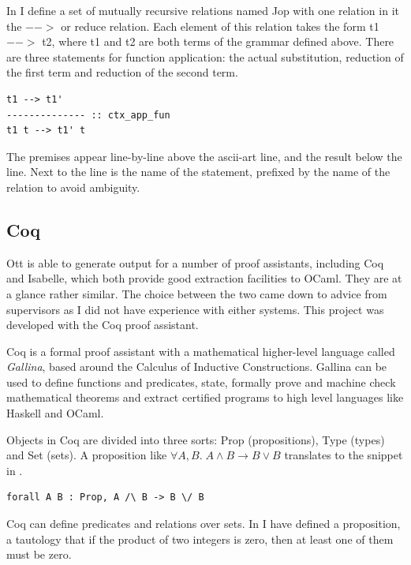 \documentclass[12pt,twoside,notitlepage]{report}
\begin{document}
In  I define a set of mutually recursive relations named Jop with one relation in it the $-->$ or reduce relation. Each element of this relation takes the form t1 $-->$ t2, where t1 and t2 are both terms of the grammar defined above. There are three statements for function application: the actual substitution, reduction of the first term and reduction of the second term. 

\begin{lstlisting}[language={Ott}, caption={Ott single reduction}]
t1 --> t1'
-------------- :: ctx_app_fun
t1 t --> t1' t
\end{lstlisting}

The premises appear line-by-line above the ascii-art line, and the result below the line. Next to the line is the name of the statement, prefixed by the name of the relation to avoid ambiguity. 



\subsection{Coq}
Ott is able to generate output for a number of proof assistants, including Coq and Isabelle, which both provide good extraction facilities to OCaml. They are at a glance rather similar. The choice between the two came down to advice from supervisors as I did not have experience with either systems. This project was developed with the Coq proof assistant. 

Coq is a formal proof assistant with a mathematical higher-level language called \textit{Gallina}, based around the Calculus of Inductive Constructions. Gallina can be used to define functions and predicates, state, formally prove and machine check mathematical theorems and extract certified programs to high level languages like Haskell and OCaml.


Objects in Coq are divided into three sorts: Prop (propositions), Type (types) and Set (sets).  A proposition like $ \forall A, B.\; A \wedge B \rightarrow B \vee B $ translates to the snippet in .


\begin{lstlisting}[language={Coq},caption={Coq Prop logic example},label={lst:coqproplogex}]
forall A B : Prop, A /\ B -> B \/ B
\end{lstlisting}


Coq can define predicates and relations over sets. In  I have defined a proposition, a tautology that if the product of two integers is zero, then at least one of them must be zero.
\end{document}
